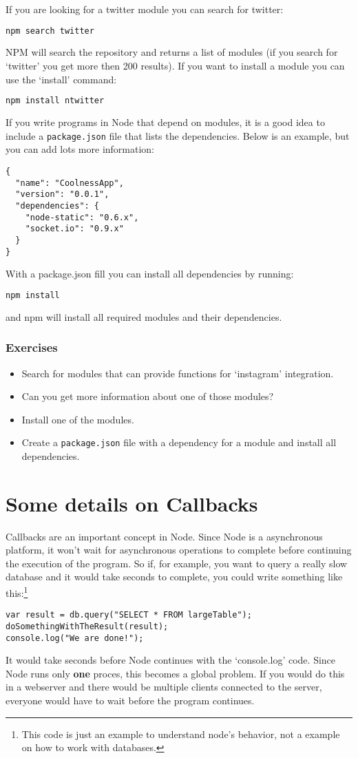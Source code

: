 \documentclass[a4paper]{report}
\begin{document}
If you are looking for a twitter module you can search for twitter:
\begin{lstlisting}[language=bash]
npm search twitter
\end{lstlisting}
NPM will search the repository and returns a list of modules (if you search for `twitter' you get more then 200 results). If you want to install a module you can use the `install' command: 
\begin{lstlisting}[language=bash]
npm install ntwitter
\end{lstlisting}
If you write programs in Node that depend on modules, it is a good idea to include a \texttt{package.json} file that lists the dependencies. Below is an example, but you can add lots more information:
\begin{lstlisting}
{
  "name": "CoolnessApp",
  "version": "0.0.1",
  "dependencies": {
    "node-static": "0.6.x",
    "socket.io": "0.9.x"
  }
}
\end{lstlisting}

\noindent With a package.json fill you can install all dependencies by running:
\begin{lstlisting}[language=bash]
npm install
\end{lstlisting}
\noindent and npm will install all required modules and their dependencies.

\subsubsection*{Exercises}
\begin{itemize}
	\item Search for modules that can provide functions for `instagram' integration.
	\item Can you get more information about one of those modules?
	\item Install one of the modules.
	\item Create a \texttt{package.json} file with a dependency for a module and install all dependencies.
\end{itemize}

\section*{Some details on Callbacks}
Callbacks are an important concept in Node. Since Node is a asynchronous platform, it won't wait for asynchronous operations to complete before continuing the execution of the program. So if, for example, you want to query a really slow database and it would take seconds to complete, you could write something like this:\footnote{This code is just an example to understand node's behavior, not a example on how to work with databases.}
\begin{lstlisting}
var result = db.query("SELECT * FROM largeTable");
doSomethingWithTheResult(result);
console.log("We are done!");
\end{lstlisting}
\noindent It would take seconds before Node continues with the `console.log' code. Since Node runs only \textbf{one} proces, this becomes a global problem. If you would do this in a webserver and there would be multiple clients connected to the server, everyone would have to wait before the program continues. 
\end{document}
